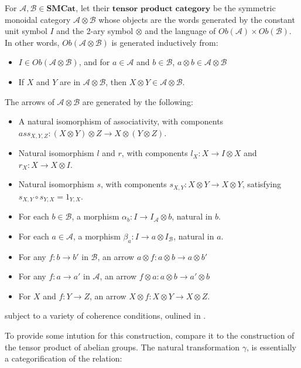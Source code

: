 \begin{defn}\label{smcatmon}
  For $\mathcal{A}, \mathcal{B} \in \mathbf{SMCat}$, let their $\textbf{tensor product category}$ be the symmetric monoidal category $\mathcal{A} \otimes \mathcal{B}$ whose objects are the words generated by the constant unit symbol $I$ and the 2-ary symbol $\otimes$ and the language of $Ob(\mathcal{A}) \times Ob(\mathcal{B})$. In other words, $Ob(\mathcal{A} \otimes \mathcal{B})$ is generated inductively from:
  \begin{itemize}
  \item $I \in Ob(\mathcal{A} \otimes \mathcal{B})$, and for $a \in \mathcal{A}$ and $b \in \mathcal{B}$, $a \otimes b \in \mathcal{A}\otimes\mathcal{B}$
  \item If $X$ and $Y$ are in $\mathcal{A} \otimes \mathcal{B}$, then $X \otimes Y \in \mathcal{A} \otimes \mathcal{B}$.
  \end{itemize}
  The arrows of $\mathcal{A} \otimes \mathcal{B}$ are generated by the following:
  \begin{itemize}
  \item A natural isomorphism of associativity, with components $ass_{X, Y, Z} : (X \otimes Y) \otimes Z \to X \otimes (Y \otimes Z)$.
  \item Natural isomorphism $l$ and $r$, with components $l_X : X \to I \otimes X$ and $r_X : X \to X \otimes I$.
  \item Natural isomorphism $s$, with components $s_{X, Y} : X \otimes Y \to X \otimes Y$, satisfying $s_{X, Y} \circ s_{Y, X} = 1_{Y, X}$.
  \item For each $b \in \mathcal{B}$, a morphism $\alpha_b : I \to I_{\mathcal{A}} \otimes b$, natural in $b$.
  \item For each $a \in \mathcal{A}$, a morphism $\beta_a : I \to a \otimes I_{\mathcal{B}}$, natural in $a$.
  \item For any $f : b \to b'$ in $\mathcal{B}$, an arrow $a \otimes f : a \otimes b \to a \otimes b'$
  \item For any $f : a \to a'$ in $\mathcal{A}$, an arrow $f \otimes a : a \otimes b \to a' \otimes b$
  \item For $X$ and $f : Y \to Z$, an arrow $X \otimes f : X \otimes Y \to X \otimes Z$.
  \end{itemize}
  subject to a variety of coherence conditions, oulined in \cite{smcat}.
\end{defn}
To provide some intution for this construction, compare it to the construction of the tensor product of abelian groups. The natural transformation $\gamma$, is essentially a categorification of the relation:
